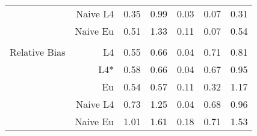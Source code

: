 \documentclass[a4paper,12pt,twoside]{book}
\begin{document}
\begin{table}[H]
\begin{tabular}{crrrrrr}
&Naive L4&  
   0.35 & 0.99 & 0.03 & 0.07 & 0.31 \\
   
&Naive Eu &  0.51 & 1.33 & 0.11 & 0.07 & 0.54 \\ \\
  
   \hline
   
{\color{blue} Relative Bias } & L4  &0.55 & 0.66 & 0.04 & 0.71 & 0.81 \\ 
   
&L4*  & 0.58 & 0.66 & 0.04 & 0.67 & 0.95 \\ 
  
  
&Eu &  
  0.54 & 0.57 & 0.11 & 0.32 & 1.17 \\ 
  
 
&Naive L4&  
  
  0.73 & 1.25 & 0.04 & 0.68 & 0.96 \\
  
  
  
&Naive Eu &  
 1.01 & 1.61 & 0.18 & 0.71 & 1.53 \\ 
  
\end{tabular}

\end{table}
\end{document}
